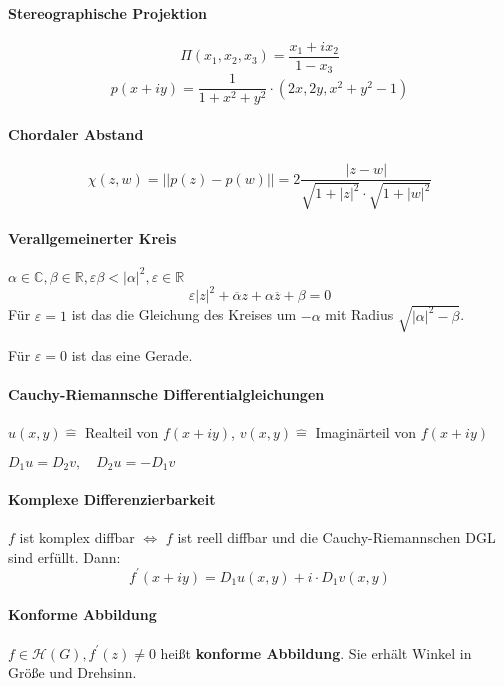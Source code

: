 \documentclass[a4paper, 10pt, DIV20, headings=small]{scrartcl}
\theoremstyle{definition}
\theoremstyle{plain}
\begin{document}
\paragraph{Stereographische Projektion}
$$\Pi(x_1,x_2,x_3) = \frac{x_1 + i x_2}{1 - x_3}$$
$$p(x+iy) = \frac{1}{1+x^2+y^2}\cdot (2x, 2y, x^2+y^2-1)$$

\paragraph{Chordaler Abstand}
$$\chi (z,w) = ||p(z)-p(w)|| = 2 \frac{|z-w|}{\sqrt{1+|z|^2} \cdot \sqrt{1+|w|^2}}$$

\paragraph{Verallgemeinerter Kreis}
$\alpha \in \mathbb{C}, \beta \in \mathbb{R}, \varepsilon \beta < |\alpha|^2, \varepsilon \in \mathbb{R}$
$$\varepsilon |z|^2 + \overline{\alpha}z + \alpha \overline{z} + \beta = 0$$
Für $\varepsilon = 1$ ist das die Gleichung des Kreises um $- \alpha$ mit Radius $\sqrt{|\alpha|^2-\beta}$.

Für $\varepsilon = 0$ ist das eine Gerade.

\paragraph{Cauchy-Riemannsche Differentialgleichungen}
$u(x,y) \hat{=}$ Realteil von $f(x+iy)$, 
$v(x,y) \hat{=}$ Imaginärteil von $f(x+iy)$

$D_1u = D_2v,\quad D_2u = -D_1v$

\paragraph{Komplexe Differenzierbarkeit}
$f$ ist komplex diffbar $\Leftrightarrow$ $f$ ist reell diffbar und die Cauchy-Riemannschen DGL sind erfüllt. Dann:
$$f^\prime(x + iy) = D_1 u(x, y) + i \cdot D_1 v(x, y)$$

\paragraph{Konforme Abbildung}
$f \in \mathcal{H}(G), f^\prime(z) \neq 0$ heißt \textbf{konforme Abbildung}. Sie erhält Winkel in Größe und Drehsinn.
\end{document}
